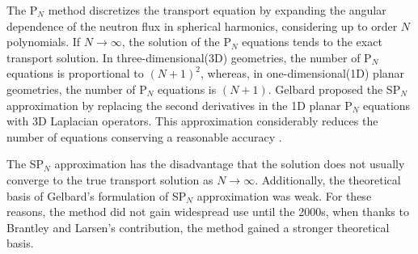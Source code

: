 \documentclass{anstrans}
\begin{document}
The P$_N$ method \cite{davidson_neutron_1957} discretizes the transport equation by expanding the angular dependence of the neutron flux in spherical harmonics, considering up to order $N$ polynomials.
If $N \rightarrow \infty$, the solution of the P$_N$ equations tends to the exact transport solution.
In three-dimensional(3D) geometries, the number of P$_N$ equations is proportional to $(N+1)^2$, whereas, in one-dimensional(1D) planar geometries, the number of P$_N$ equations is $(N+1)$.
Gelbard \cite{gelbard_spherical_1960} proposed the SP$_N$ approximation by replacing the second derivatives in the 1D planar P$_N$ equations with 3D Laplacian operators.
This approximation considerably reduces the number of equations conserving a reasonable accuracy \cite{capilla_applications_2009}.

The SP$_N$ approximation has the disadvantage that the solution does not usually converge to the true transport solution as $N \rightarrow \infty$.
Additionally, the theoretical basis of Gelbard's formulation of SP$_N$ approximation was weak.
For these reasons, the method did not gain widespread use until the 2000s, when thanks to Brantley and Larsen's \cite{brantley_simplifiedP3_2000} contribution, the method gained a stronger theoretical basis.
\end{document}
